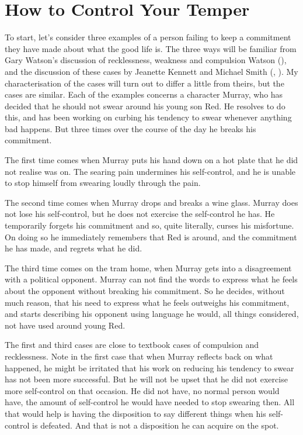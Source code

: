\documentclass[
  11pt,
  letterpaper,
  DIV=11,
  numbers=noendperiod,
  oneside]{scrartcl}
\begin{document}
\section{How to Control Your Temper}\label{how-to-control-your-temper}

To start, let's consider three examples of a person failing to keep a
commitment they have made about what the good life is. The three ways
will be familiar from Gary Watson's discussion of recklessness, weakness
and compulsion Watson (), and the
discussion of these cases by Jeanette Kennett and Michael Smith
(,
). My characterisation of the
cases will turn out to differ a little from theirs, but the cases are
similar. Each of the examples concerns a character Murray, who has
decided that he should not swear around his young son Red. He resolves
to do this, and has been working on curbing his tendency to swear
whenever anything bad happens. But three times over the course of the
day he breaks his commitment.

The first time comes when Murray puts his hand down on a hot plate that
he did not realise was on. The searing pain undermines his self-control,
and he is unable to stop himself from swearing loudly through the pain.

The second time comes when Murray drops and breaks a wine glass. Murray
does not lose his self-control, but he does not exercise the
self-control he has. He temporarily forgets his commitment and so, quite
literally, curses his misfortune. On doing so he immediately remembers
that Red is around, and the commitment he has made, and regrets what he
did.

The third time comes on the tram home, when Murray gets into a
disagreement with a political opponent. Murray can not find the words to
express what he feels about the opponent without breaking his
commitment. So he decides, without much reason, that his need to express
what he feels outweighs his commitment, and starts describing his
opponent using language he would, all things considered, not have used
around young Red.

The first and third cases are close to textbook cases of compulsion and
recklessness. Note in the first case that when Murray reflects back on
what happened, he might be irritated that his work on reducing his
tendency to swear has not been more successful. But he will not be upset
that he did not exercise more self-control on that occasion. He did not
have, no normal person would have, the amount of self-control he would
have needed to stop swearing then. All that would help is having the
disposition to say different things when his self-control is defeated.
And that is not a disposition he can acquire on the spot.
\end{document}
